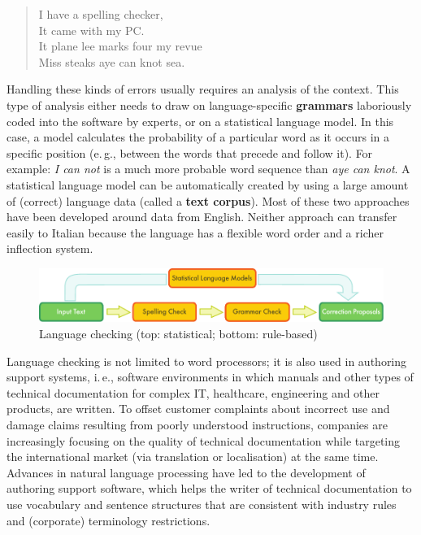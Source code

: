 \begin{multicols}{2}
\begin{quote}
  I have a spelling checker,\\
  It came with my PC.\\
  It plane lee marks four my revue\\
  Miss steaks aye can knot sea.
\end{quote}
 
Handling these kinds of errors usually requires an analysis of the context.
This type of analysis either needs to draw on language-specific
\textbf{grammars} laboriously coded into the software by experts, or on a
statistical language model. In this case, a model calculates the probability
of a particular word as it occurs in a specific position (e.\,g., between the
words that precede and follow it). For example: \emph{I can not} is a much more probable word sequence than \emph{aye can knot}. A statistical language model can be automatically created by using a large amount of (correct) language data (called a \textbf{text corpus}). Most of these two approaches have been developed around data from English. Neither approach can transfer easily to Italian because the language has a flexible word order and a richer inflection system. 

\begin{figure}[htb]
  \center
  \includegraphics[width=\textwidth]{../_media/english/language_checking}
  \caption{Language checking (top: statistical; bottom: rule-based)}
\label{fig:langcheckingaarch_en}
\end{figure}


Language checking is not limited to word processors; it is also used in authoring support systems, i.\,e., software environments in which manuals and other types of technical documentation for complex IT, healthcare, engineering and other products, are written. To offset customer complaints about incorrect use and damage claims resulting from poorly understood instructions, companies are increasingly focusing on the quality of technical documentation while targeting the international market (via translation or localisation) at the same time. Advances in natural language processing have led to the development of authoring support software, which helps the writer of technical documentation to use vocabulary and sentence structures that are consistent with industry rules and (corporate) terminology restrictions.


\end{multicols}
